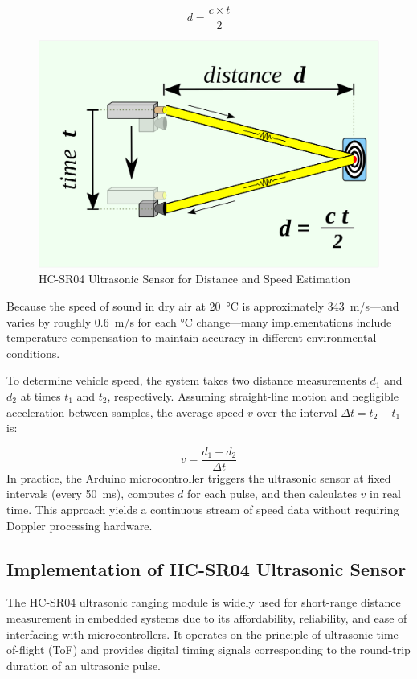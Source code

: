 \begin{equation}
  d = \frac{c \times t}{2}
  \label{eq:tof_distance}
\end{equation}

\begin{figure}[htbp]
  \centering
  \includegraphics[width=0.8 \linewidth]{figures/ultrasonic.png}
    \caption{HC-SR04 Ultrasonic Sensor for Distance and Speed Estimation}
  \label{fig:ultrasonic-sensor}
\end{figure}


Because the speed of sound in dry air at 20~°C is approximately 343~m/s—and varies by roughly 0.6~m/s for each °C change—many implementations include temperature compensation to maintain accuracy in different environmental conditions.\cite{smith2020ultrasonic}

To determine vehicle speed, the system takes two distance measurements $d_1$ and $d_2$ at times $t_1$ and $t_2$, respectively. Assuming straight-line motion and negligible acceleration between samples, the average speed $v$ over the interval $\Delta t = t_2 - t_1$ is:

\begin{equation}
  v = \frac{d_1 - d_2}{\Delta t}
  \label{eq:speed_estimation}
\end{equation}
In practice, the Arduino microcontroller triggers the ultrasonic sensor at fixed intervals (every 50~ms), computes $d$ for each pulse, and then calculates $v$ in real time. This approach yields a continuous stream of speed data without requiring Doppler processing hardware.\cite{johnson2019measuring}

\subsection*{Implementation of HC-SR04 Ultrasonic Sensor}
The HC-SR04 ultrasonic ranging module is widely used for short-range distance measurement in embedded systems due to its affordability, reliability, and ease of interfacing with microcontrollers. It operates on the principle of ultrasonic time-of-flight (ToF) and provides digital timing signals corresponding to the round-trip duration of an ultrasonic pulse.

